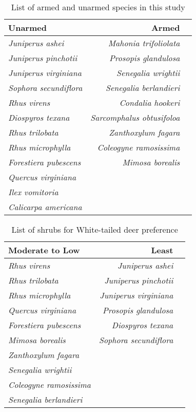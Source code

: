 \documentclass{ttuthes2007}
\begin{document}
\begin{table}
    \centering
    \begin{tabular}{lrr}
          Unarmed &  Armed \\
          \hline
          \emph{Juniperus ashei} & \emph{Mahonia trifoliolata}\\
          \emph{Juniperus pinchotii} & \emph{Prosopis glandulosa}\\
          \emph{Juniperus virginiana} & \emph{Senegalia wrightii}\\
          \emph{Sophora secundiflora} & \emph{Senegalia berlandieri}\\
          \emph{Rhus virens} & \emph{Condalia hookeri}\\
          \emph{Diospyros texana} & \emph{Sarcomphalus obtusifoloa}\\
          \emph{Rhus trilobata} & \emph{Zanthoxylum fagara}\\
          \emph{Rhus microphylla} & \emph{Coleogyne ramosissima}\\
          \emph{Forestiera pubescens} & \emph{Mimosa borealis}\\
          \emph{Quercus virginiana} &   \\
          \emph{Ilex vomitoria} &    \\
          \emph{Calicarpa americana} & \\
    \end{tabular}
    \caption{List of armed and unarmed species in this study}
\end{table} 

\begin{table}
    \centering
    \begin{tabular}{lrr}
     Moderate to Low & Least \\
     \hline
    \emph{Rhus virens} & \emph{Juniperus ashei} \\
    \emph{Rhus trilobata} & \emph{Juniperus pinchotii}\\
    \emph{Rhus microphylla} & \emph{Juniperus virginiana}\\
    \emph{Quercus virginiana} & \emph{Prosopis glandulosa}\\
    \emph{Forestiera pubescens} & \emph{Diospyros texana}\\
    \emph{Mimosa borealis} & \emph{Sophora secundiflora}\\
    \emph{Zanthoxylum fagara} &   \\
    \emph{Senegalia wrightii} & \\
    \emph{Coleogyne ramosissima} & \\
    \emph{Senegalia berlandieri} & \\
    \end{tabular}
    \caption{List of shrubs for White-tailed deer preference \citep*{wright2003white}}
\end{table}
\end{document}
